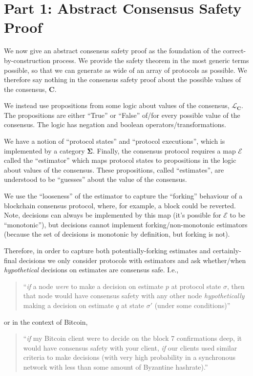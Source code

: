 \documentclass{article}
\theoremstyle{definition}
\newcommand{\cat}{
	\mathbf
}
\begin{document}
\section{Part 1: Abstract Consensus Safety Proof}

We now give an abstract consensus safety proof as the foundation of the correct-by-construction process. We provide the safety theorem in the most generic terms possible, so that we can generate as wide of an array of protocols as possible. We therefore say nothing in the consensus safety proof about the possible values of the consensus, $\cat{C}$.

We instead use propositions from some logic about values of the consensus, $\mathcal{L}_\cat{C}$. The propositions are either ``True'' or ``False'' of/for every possible value of the consensus. The logic has negation and boolean operators/transformations.

We have a notion of ``protocol states'' and ``protocol executions'', which is implemented by a category $\cat{\Sigma}$. Finally, the consensus protocol requires a map $\mathcal{E}$ called the ``estimator'' which maps protocol states to propositions in the logic about values of the consensus. These propositions, called ``estimates'', are understood to be ``guesses'' about the value of the consensus.

We use the ``looseness'' of the estimator to capture the ``forking'' behaviour of a blockchain consensus protocol, where, for example, a block could be reverted. Note, decisions can always be implemented by this map (it's possible for $\mathcal{E}$ to be ``monotonic''), but decisions cannot implement forking/non-monotonic estimators (because the set of decisions is monotonic by definition, but forking is not).

Therefore, in order to capture both potentially-forking estimates and certainly-final decisions we only consider protocols with estimators and ask whether/when \emph{hypothetical} decisions on estimates are consensus safe. I.e.,

\begin{quote}
``\emph{if} a node \emph{were} to make a decision on estimate $p$ at protocol state $\sigma$, then that node would have consensus safety with any other node \emph{hypothetically} making a decision on estimate $q$ at state $\sigma'$ (under some conditions)''
\end{quote}

or in the context of Bitcoin,

\begin{quote}
``\emph{if} my Bitcoin client were to decide on the block 7 confirmations deep, it would have consensus safety with your client, \emph{if} our clients used similar criteria to make decisions (with very high probability in a synchronous network with less than some amount of Byzantine hashrate).''
\end{quote}
\end{document}
